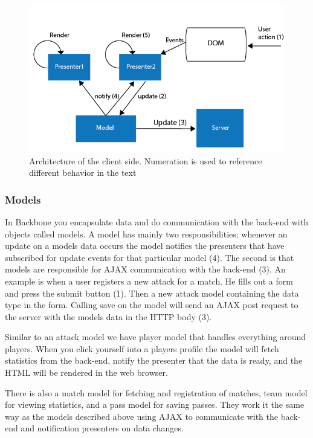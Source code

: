 
\begin{figure}[ht!]
\centering
\includegraphics[width=1\textwidth]{images/architecture/backbone_architecture.png}
\caption{Architecture of the client side. Numeration is used to reference different behavior in the text}
\label{fig:backbone_architecture}
\end{figure}

\subsubsection{Models}

In Backbone you encapsulate data and do communication with the back-end with objects called models. A model has mainly two responsibilities; whenever an update on a models data occurs the model notifies the presenters that have subscribed for update events for that particular model (4). The second is that models are responsible for \ac{AJAX} communication with the back-end (3). An example is when a user registers a new attack for a match. He fills out a form and press the submit button (1). Then a new attack model containing the data type in the form. Calling save on the  model will send an \ac{AJAX} post request to the server with the models data in the \ac{HTTP} body (3).

Similar to an attack model we have player model that handles everything around players. When you click yourself into a players profile the model will fetch statistics from the back-end, notify the presenter that the data is ready, and the \ac{HTML} will be rendered in the web browser.

There is also a match model for fetching and registration of matches, team model for viewing statistics, and a pass model for saving passes. They work it the same way as the models described above using \ac{AJAX} to communicate with the back-end and notification presenters on data changes.

